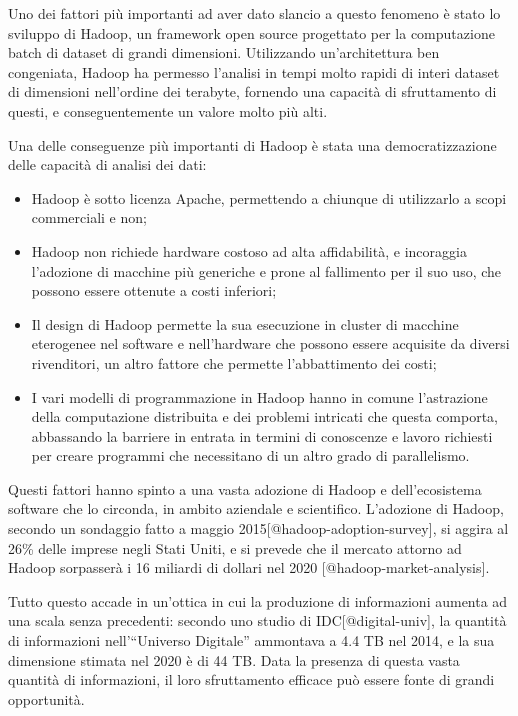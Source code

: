 \documentclass[italian,a4paper, twoside, 12pt]{report}
\providecommand{\tightlist}{%
  \setlength{\itemsep}{0pt}\setlength{\parskip}{0pt}}
\begin{document}
Uno dei fattori più importanti ad aver dato slancio a questo fenomeno è
stato lo sviluppo di Hadoop, un framework open source progettato per la
computazione batch di dataset di grandi dimensioni. Utilizzando
un'architettura ben congeniata, Hadoop ha permesso l'analisi in tempi
molto rapidi di interi dataset di dimensioni nell'ordine dei terabyte,
fornendo una capacità di sfruttamento di questi, e conseguentemente un
valore molto più alti.

Una delle conseguenze più importanti di Hadoop è stata una
democratizzazione delle capacità di analisi dei dati:

\begin{itemize}
\tightlist
\item
  Hadoop è sotto licenza Apache, permettendo a chiunque di utilizzarlo a
  scopi commerciali e non;
\item
  Hadoop non richiede hardware costoso ad alta affidabilità, e
  incoraggia l'adozione di macchine più generiche e prone al fallimento
  per il suo uso, che possono essere ottenute a costi inferiori;
\item
  Il design di Hadoop permette la sua esecuzione in cluster di macchine
  eterogenee nel software e nell'hardware che possono essere acquisite
  da diversi rivenditori, un altro fattore che permette l'abbattimento
  dei costi;
\item
  I vari modelli di programmazione in Hadoop hanno in comune
  l'astrazione della computazione distribuita e dei problemi intricati
  che questa comporta, abbassando la barriere in entrata in termini di
  conoscenze e lavoro richiesti per creare programmi che necessitano di
  un altro grado di parallelismo.
\end{itemize}

Questi fattori hanno spinto a una vasta adozione di Hadoop e
dell'ecosistema software che lo circonda, in ambito aziendale e
scientifico. L'adozione di Hadoop, secondo un sondaggio fatto a maggio
2015{[}@hadoop-adoption-survey{]}, si aggira al 26\% delle imprese negli
Stati Uniti, e si prevede che il mercato attorno ad Hadoop sorpasserà i
16 miliardi di dollari nel 2020 {[}@hadoop-market-analysis{]}.

Tutto questo accade in un'ottica in cui la produzione di informazioni
aumenta ad una scala senza precedenti: secondo uno studio di
IDC{[}@digital-univ{]}, la quantità di informazioni nell'``Universo
Digitale'' ammontava a 4.4 TB nel 2014, e la sua dimensione stimata nel
2020 è di 44 TB. Data la presenza di questa vasta quantità di
informazioni, il loro sfruttamento efficace può essere fonte di grandi
opportunità.
\end{document}

